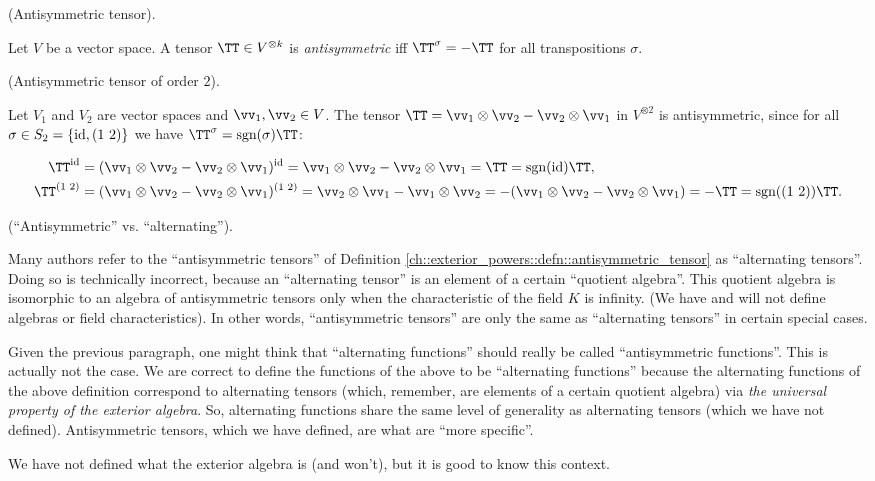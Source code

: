 \begin{defn}
\label{ch::exterior_powers::defn::antisymmetric_tensor}
    (Antisymmetric tensor).
    
    Let $V$ be a vector space. A tensor $\TT \in V^{\otimes k}$ is \textit{antisymmetric} iff  $\TT^\sigma = -\TT$ for all transpositions $\sigma$.
\end{defn}

\begin{example}
    (Antisymmetric tensor of order $2$).

    Let $V_1$ and $V_2$ are vector spaces and $\vv_1, \vv_2 \in V$. The tensor $\TT = \vv_1 \otimes \vv_2 - \vv_2 \otimes \vv_1$ in $V^{\otimes 2}$ is antisymmetric, since for all $\sigma \in S_2 = \{\text{id}, (1 \text{ } 2)\}$ we have $\TT^\sigma = \sgn(\sigma) \TT$:

    \begin{align*}
        \TT^\id &= (\vv_1 \otimes \vv_2 - \vv_2 \otimes \vv_1)^{\id} = \vv_1 \otimes \vv_2 - \vv_2 \otimes \vv_1 = \TT = \sgn(\id) \TT, \\
        \TT^{(1 \spc 2)} &= (\vv_1 \otimes \vv_2 - \vv_2 \otimes \vv_1)^{(1 \spc 2)} = \vv_2 \otimes \vv_1 - \vv_1 \otimes \vv_2 = -(\vv_1 \otimes \vv_2 - \vv_2 \otimes \vv_1) = -\TT = \sgn((1 \spc 2)) \TT.
    \end{align*}
\end{example}

\begin{remark}
\label{ch::exterior_powers::rmk::alternating_antisymmetric}

    (``Antisymmetric'' vs. ``alternating'').
    
    Many authors refer to the ``antisymmetric tensors'' of Definition \ref{ch::exterior_powers::defn::antisymmetric_tensor} as ``alternating tensors''. Doing so is technically incorrect, because an ``alternating tensor'' is an element of a certain ``quotient algebra''. This quotient algebra is isomorphic to an algebra of antisymmetric tensors only when the characteristic of the field $K$ is infinity. (We have and will not define algebras or field characteristics). In other words, ``antisymmetric tensors'' are only the same as ``alternating tensors'' in certain special cases.
    
    Given the previous paragraph, one might think that ``alternating functions'' should really be called ``antisymmetric functions''. This is actually not the case. We are correct to define the functions of the above to be ``alternating functions'' because the alternating functions of the above definition correspond to alternating tensors (which, remember, are elements of a certain quotient algebra) via \textit{the universal property of the exterior algebra}. So, alternating functions share the same level of generality as alternating tensors (which we have not defined). Antisymmetric tensors, which we have defined, are what are ``more specific''.
    
    We have not defined what the exterior algebra is (and won't), but it is good to know this context.
\end{remark}

